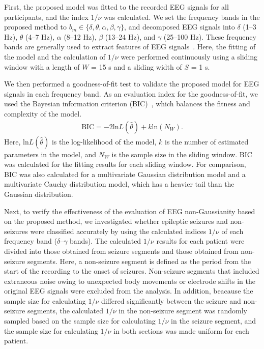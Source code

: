 \documentclass[journal]{IEEEtran}
\begin{document}
First, the proposed model was fitted to the recorded EEG signals for all participants, and the index $1/\nu$ was calculated.
We set the frequency bands in the proposed method to $b_m \in\{\delta, \theta, \alpha,\beta, \gamma\}$, and decomposed EEG signals into $\delta$ (1--3 Hz), $\theta$ (4--7 Hz), $\alpha$ (8--12 Hz), $\beta$ (13--24 Hz), and $\gamma$ (25--100 Hz).
These frequency bands are generally used to extract features of EEG signals~\cite{ep1994}.
Here, the fitting of the model and the calculation of $1/\nu$ were performed continuously using a sliding window with a length of $W$ = 15 s and a sliding width of $S$ = 1 s.

We then performed a goodness-of-fit test to validate the proposed model for EEG signals in each frequency band.
As an evaluation index for the goodness-of-fit, we used the Bayesian information criterion (BIC)~\cite{Schwarz1978}, which balances the fitness and complexity of the model.
%
\begin{align}%
	\mathrm{BIC} = -2 \mathrm{ln}L(\hat{\theta}) + k \mathrm{ln}(N_W).
\end{align}
%
Here, $\mathrm{ln}L(\hat{\theta})$ is the log-likelihood of the model, $k$ is the number of estimated parameters in the model, and $N_W$ is the sample size in the sliding window. 
BIC was calculated for the fitting results for each sliding window.
For comparison, BIC was also calculated for a multivariate Gaussian distribution model and a multivariate Cauchy distribution model, which has a heavier tail than the Gaussian distribution.

Next, to verify the effectiveness of the evaluation of EEG non-Gaussianity based on the proposed method, we investigated whether epileptic seizures and non-seizures were classified accurately by using the calculated indices $1/\nu$ of each frequency band ($\delta$--$\gamma$ bands). 
The calculated $1/\nu$ results for each patient were divided into those obtained from seizure segments and those obtained from non-seizure segments.
Here, a non-seizure segment is defined as the period from the start of the recording to the onset of seizures.
Non-seizure segments that included extraneous noise owing to unexpected body movements or electrode shifts in the original EEG signals were excluded from the analysis.
In addition, beacause the sample size for calculating $1/\nu$ differed significantly between the seizure and non-seizure segments, the calculated $1/\nu$ in the non-seizure segment was randomly sampled based on the sample size for calculating $1/\nu$ in the seizure segment, and the sample size for calculating $1/\nu$ in both sections was made uniform for each patient.
\end{document}
